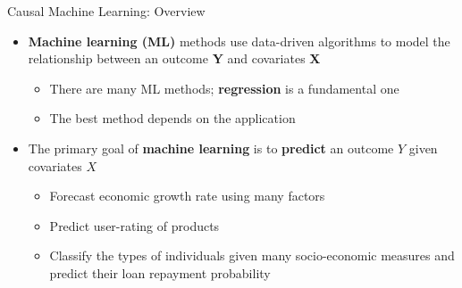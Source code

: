 \documentclass[dvipsnames,hyperref={pdfpagelabels=false}]{beamer}
\begin{document}
\begin{frame}{Causal Machine Learning: Overview}
	\begin{itemize}
		\item \textbf{Machine learning (ML)} methods use data-driven algorithms to model the relationship between an outcome \textbf{Y} and covariates \textbf{X}
		\vspace{0.2cm}
		\begin{itemize}
			\item There are many ML methods; \textbf{regression} is a fundamental one
			\vspace{0.2cm}
			\item The best method depends on the application
		\end{itemize}
		\vspace{0.2cm}
	\item The primary goal of \textbf{machine learning} is to \textbf{predict} an outcome $Y$ given covariates $X$
		\vspace{0.2cm}
	\begin{itemize}
					\item Forecast economic growth rate using many factors
					\vspace{0.2cm}
					\item Predict user-rating of products
										\vspace{0.2cm}
					\item Classify the types of individuals given many socio-economic measures and predict their loan repayment probability
					\vspace{0.2cm}
				\end{itemize}
        
	\end{itemize}
\end{frame}
\end{document}
